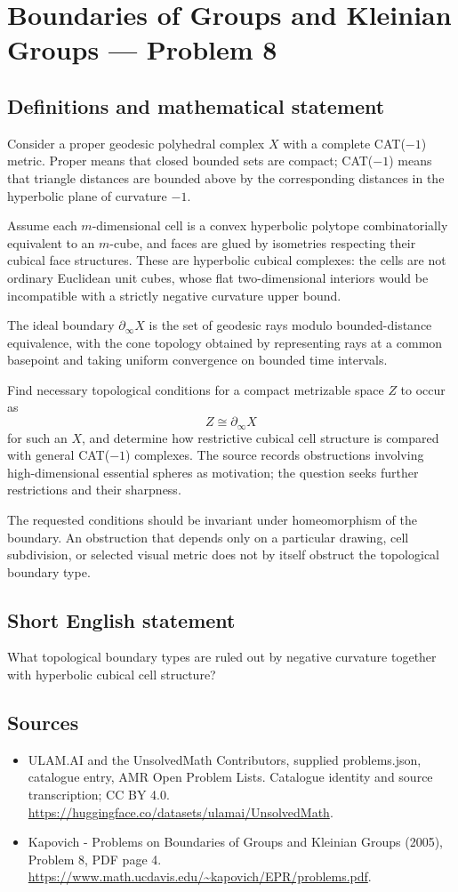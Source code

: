 \documentclass[11pt,a4paper]{article}
\begin{document}
\section*{Boundaries of Groups and Kleinian Groups — Problem 8}\label{statement}

\subsection{Definitions and mathematical statement}
Consider a proper geodesic polyhedral complex $X$ with a complete CAT($-1$) metric. Proper means that closed bounded sets are compact; CAT($-1$) means that triangle distances are bounded above by the corresponding distances in the hyperbolic plane of curvature $-1$.

Assume each $m$-dimensional cell is a convex hyperbolic polytope combinatorially equivalent to an $m$-cube, and faces are glued by isometries respecting their cubical face structures. These are hyperbolic cubical complexes: the cells are not ordinary Euclidean unit cubes, whose flat two-dimensional interiors would be incompatible with a strictly negative curvature upper bound.

The ideal boundary $\partial_\infty X$ is the set of geodesic rays modulo bounded-distance equivalence, with the cone topology obtained by representing rays at a common basepoint and taking uniform convergence on bounded time intervals.

Find necessary topological conditions for a compact metrizable space $Z$ to occur as
\[
 Z\cong\partial_\infty X
\]
for such an $X$, and determine how restrictive cubical cell structure is compared with general CAT($-1$) complexes. The source records obstructions involving high-dimensional essential spheres as motivation; the question seeks further restrictions and their sharpness.

The requested conditions should be invariant under homeomorphism of the boundary. An obstruction that depends only on a particular drawing, cell subdivision, or selected visual metric does not by itself obstruct the topological boundary type.
\subsection{Short English statement}
What topological boundary types are ruled out by negative curvature together with hyperbolic cubical cell structure?
\subsection{Sources}
\begin{itemize}
\item[S1] ULAM.AI and the UnsolvedMath Contributors, supplied problems.json, catalogue entry, AMR Open Problem Lists. Catalogue identity and source transcription; CC BY 4.0.
\url{https://huggingface.co/datasets/ulamai/UnsolvedMath}.
\item[S2] Kapovich - Problems on Boundaries of Groups and Kleinian Groups (2005), Problem 8, PDF page 4. 
\url{https://www.math.ucdavis.edu/~kapovich/EPR/problems.pdf}.
\end{itemize}
\end{document}
